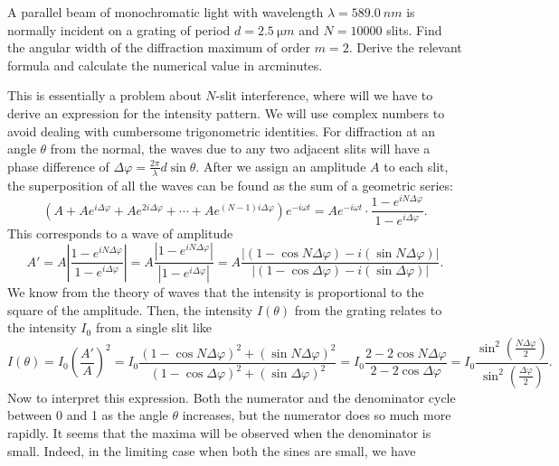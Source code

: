 \documentclass[../TST.tex]{subfiles}
\begin{document}
\begin{pproblem}
A parallel beam of monochromatic light with wavelength $\lambda=\qty{589.0}{nm}$ is normally incident on a grating of period $d=\qty{2.5}{\micro m}$ and $N=10000$ slits. Find the angular width of the diffraction maximum of order $m=2$. Derive the relevant formula and calculate the numerical value in arcminutes.
\end{pproblem}

\ifprob \else
\begin{solution} 
	This is essentially a problem about $N$-slit interference, where will we have to derive an expression for the intensity pattern. We will use complex numbers to avoid dealing with cumbersome trigonometric identities. For diffraction at an angle $\theta$ from the normal, the waves due to any two adjacent slits will have a phase difference of $\Delta \varphi = \frac{2\pi}{\lambda} d\sin{\theta}$. After we assign an amplitude $A$ to each slit, the superposition of all the waves can be found as the sum of a geometric series:
	\begin{equation*}
		\left( A+Ae^{i\Delta\varphi}+Ae^{2i\Delta\varphi}+\cdots+Ae^{(N-1)i\Delta\varphi}\right)e^{-i\omega t}= Ae^{-i\omega t}\cdot \frac{1-e^{iN\Delta\varphi}}{1-e^{i\Delta\varphi}}
	.
	\end{equation*}
This corresponds to a wave of amplitude 
\begin{equation*}
	A'=A\left|\frac{1-e^{iN\Delta\varphi}}{1-e^{i\Delta\varphi}}\right| = A \frac{\left|1-e^{iN\Delta\varphi}\right| }{\left|1-e^{i\Delta\varphi}\right|} = A \frac{\left|(1-\cos{N\Delta\varphi})-i(\sin{N\Delta\varphi})\right| }{\left|(1-\cos{\Delta\varphi})-i(\sin{\Delta\varphi})\right|}
.
\end{equation*}
We know from the theory of waves that the intensity is proportional to the square of the amplitude. Then, the intensity $I(\theta)$ from the grating relates to the intensity $I_0$ from a single slit like
\begin{equation*}
	I(\theta) = I_0 \left(\frac{A'}{A}\right)^2= I_0 \frac{(1-\cos{N\Delta\varphi})^2+(\sin{N\Delta\varphi})^2}{(1-\cos{\Delta\varphi})^2+(\sin{\Delta\varphi})^2}=I_0 \frac{2-2\cos{N\Delta\varphi}}{2-2\cos{\Delta\varphi}}= I_0 \frac{\sin^2\left(\frac{N\Delta\varphi}{2}\right) }{\sin^2\left(\frac{\Delta\varphi}{2}\right) }
.
\end{equation*}
Now to interpret this expression. Both the numerator and the denominator cycle between 0 and 1 as the angle $\theta$ increases, but the numerator does so much more rapidly. It seems that the maxima will be observed when the denominator is small. Indeed, in the limiting case when both the sines are small, we have

\end{solution}
\end{document}
